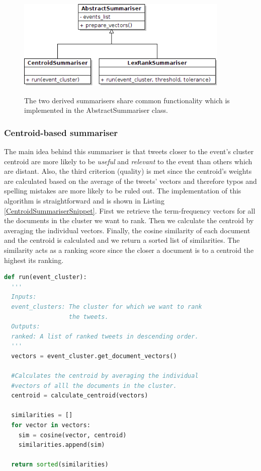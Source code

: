 \begin{figure}[htbp]
  \begin{center}
    \includegraphics[height=2.0in, width=4in]{summarisers}
    \caption{The two derived summarisers share common functionality which is implemented in the AbstractSummariser class. }
    \label{SummariserArchitecture}
  \end{center}
\end{figure} 

\subsubsection{Centroid-based summariser}
The main idea behind this summariser is that tweets closer to the event's cluster centroid are more likely to be \emph{useful} and \emph{relevant} to the event than others which are distant. Also, the third criterion (quality) is met since the centroid's weights are calculated based on the average of the tweets' vectors and therefore typos and spelling mistakes are more likely to be ruled out. The implementation of this algorithm is straightforward and is shown in Listing \ref{CentroidSummariserSnippet}. First we retrieve the term-frequency vectors for all the documents in the cluster we want to rank. Then we calculate the centroid by averaging the individual vectors. Finally, the cosine similarity of each document and the centroid is calculated and we return a sorted list of similarities. The similarity acts as a ranking score since the closer a document is to a centroid the highest its ranking.  

\begin{lstlisting}[language=Python, label=CentroidSummariserSnippet, caption=Pseudocode for the centoid-based summariser.]
def run(event_cluster):
  '''
  Inputs:
  event_clusters: The cluster for which we want to rank 
                  the tweets.
  Outputs:
  ranked: A list of ranked tweets in descending order. 
  '''        
  vectors = event_cluster.get_document_vectors()
  
  #Calculates the centroid by averaging the individual
  #vectors of alll the documents in the cluster.
  centroid = calculate_centroid(vectors)
  
  similarities = []
  for vector in vectors:
    sim = cosine(vector, centroid)
    similarities.append(sim)
  
  return sorted(similarities)
  
\end{lstlisting}

